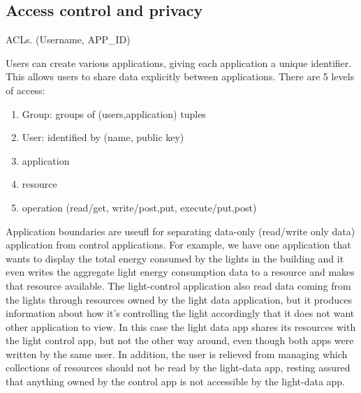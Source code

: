 \documentclass[10pt,print,letterpaper]{sigplan-proc-varsize}
\begin{document}
\subsection{Access control and privacy}
ACLs.  (Username, APP\_ID)

Users can create various applications, giving each application a unique identifier.  This allows users to share
data explicitly between applications.  There are 5 levels of access:
\begin{enumerate}
\item Group: groups of (users,application) tuples
\item User: identified by (name, public key)
\item application
\item resource
\item operation (read/get, write/post,put, execute/put,post)
\end{enumerate}

Application boundaries are useufl for separating data-only (read/write only data) application from control applications.
For example, we have one application that wants to display the total energy consumed by the lights in the building and 
it even writes the aggregate light energy consumption data to a resource and makes that resource available.  The light-control
application also read data coming from the lights through resources owned by the light data application, but it produces
information about how it's controlling the light accordingly that it does not want other application to view. 
In this case the light data app shares its resources with the light control app, but not the other way around, even though
both apps were written by the same user.  In addition, the user is relieved from managing which collections of resources
should not be read by the light-data app, resting assured that anything owned by the control app is not accessible by
the light-data app.


\vspace{+0.5mm}
\vspace{+2mm}


\end{document}

